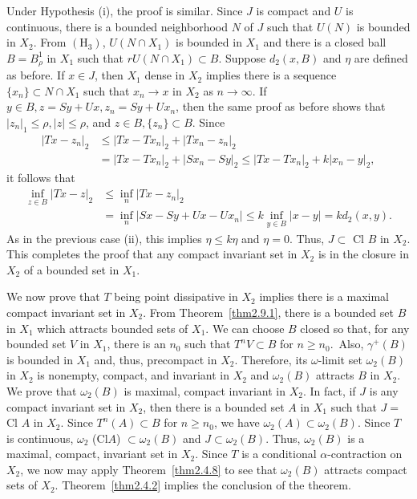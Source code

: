 \documentclass{surv-l}
\theoremstyle{plain}
\theoremstyle{definition}
\numberwithin{equation}{section}
\numberwithin{figure}{chapter}
\begin{document}
Under Hypothesis (i), the proof is similar. Since $J$ is compact and $U$ is continuous, there is a bounded neighborhood $N$ of $J$ such that $U(N)$ is bounded in $X_{2}$. From $(\mathrm{H}_{3})$, $U(N\cap X_{1})$ is bounded in $X_{1}$ and there is a closed ball $B=B_{\rho}^{1}$ in $X_{1}$ such that $rU(N\cap X_{1})\subset B$. Suppose $d_{2}(x, B)$ and $\eta$ are defined as before. If $x\in J$, then $X_{1}$ dense in $X_{2}$ implies there is a sequence $\{x_{n}\}\subset N\cap X_{1}$ such that $x_{n}\rightarrow x$ in $X_{2}$ as $ n\rightarrow\infty$. If $y\in B, z=Sy+Ux, z_{n}=Sy+Ux_{n}$, then the same proof as before shows that $|z_{n}|_{1}\leq\rho, |z| \leq\rho$, and $z\in B, \{z_{n}\}\subset B$. Since
\begin{align*}
|Tx-z_{n}|_{2}&\leq|Tx-Tx_{n}|_{2}+|Tx_{n}-z_{n}|_{2}\\
&=|Tx-Tx_{n}|_{2}+|Sx_{n}-Sy|_{2}\leq|Tx-Tx_{n}|_{2}+k|x_{n}-y|_{2},
\end{align*}
it follows that
\begin{align*}
\inf_{z\in B}|Tx-z|_{2}&\leq\inf_{n}|Tx-z_{n}|_{2}\\
&=\inf_{n}|Sx-Sy+Ux-Ux_{n}|\leq k\inf_{y\in B}|x-y|=kd_{2}(x, y).
\end{align*}
As in the previous case (ii), this implies $\eta\leq k\eta$ and $\eta=0$. Thus, $ J\subset$ Cl $B$ in $X_{2}$. This completes the proof that any compact invariant set in $X_{2}$ is in the closure in $X_{2}$ of a bounded set in $X_{1}$.

We now prove that $T$ being point dissipative in $X_{2}$ implies there is a maximal compact invariant set in $X_{2}$. From Theorem~\ref{thm2.9.1}, there is a bounded set $B$ in $X_{1}$ which attracts bounded sets of $X_{1}$. We can choose $B$ closed so that, for any bounded set $V$ in $X_{1}$, there is an $n_{0}$ such that $T^{n}V\subset B$ for $n\geq n_{0}$.\, Also, $\gamma^{+}(B)$ is bounded in $X_{1}$ and, thus, precompact in $X_{2}$. Therefore, its $\omega$-limit set $\omega_{2}(B)$ in $X_{2}$ is nonempty, compact, and invariant in $X_{2}$ and $\omega_{2}(B)$ attracts $B$ in $X_{2}$. We prove that $\omega_{2}(B)$ is maximal, compact invariant in $X_{2}$. In fact, if $J$ is any compact invariant set in $X_{2}$, then there is a bounded set $A$ in $X_{1}$ such that $J=$ Cl $A$ in $X_{2}$. Since $T^{n}(A)\subset B$ for $n\geq n_{0}$, we have $\omega_{2}(A)\subset\omega_{2}(B)$. Since $T$ is continuous, $\omega_{2}$ (Cl$A$) $\subset\omega_{2}(B)$ and $J\subset\omega_{2}(B)$. Thus, $\omega_{2}(B)$ is a maximal, compact, invariant set in $X_{2}$. Since $T$ is a conditional $\alpha$-contraction on $X_{2}$, we now may apply Theorem~\ref{thm2.4.8} to see that $\omega_{2}(B)$ attracts compact sets of $X_{2}$. Theorem~\ref{thm2.4.2} implies the conclusion of the theorem.
\end{document}
